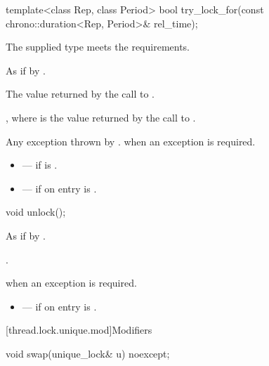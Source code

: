 %
\begin{itemdecl}
template<class Rep, class Period>
  bool try_lock_for(const chrono::duration<Rep, Period>& rel_time);
\end{itemdecl}

\begin{itemdescr}
\pnum
\expects
The supplied  type meets the  requirements.

\pnum
\effects
As if by .

\pnum
\returns
The value returned by the call to .

\pnum
\ensures
{}, where  is the value returned by the call to .

\pnum
\throws
Any exception thrown by .  when an
exception is required.

\pnum
\errors
\begin{itemize}
\item {} --- if  is .
\item {} --- if on entry  is
.
\end{itemize}
\end{itemdescr}

%
\begin{itemdecl}
void unlock();
\end{itemdecl}

\begin{itemdescr}
\pnum
\effects
As if by .

\pnum
\ensures
{}.

\pnum
\throws
{} when
an exception is required.

\pnum
\errors
\begin{itemize}
\item {} --- if on entry  is .
\end{itemize}
\end{itemdescr}

[thread.lock.unique.mod]{Modifiers}

%
\begin{itemdecl}
void swap(unique_lock& u) noexcept;
\end{itemdecl}

